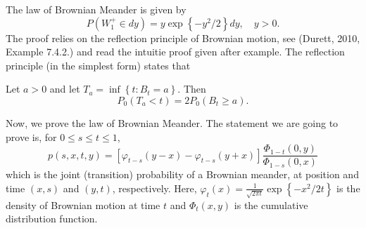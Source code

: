 \begin{tcolorbox}[breakable,title=Law of Brownian Meander,colback=yellow!10,colframe=black,]
    The law of Brownian Meander is given by
    \[
    P\left(W_1^{+} \in d y\right)=y \exp \left\{-y^2 / 2\right\} d y, \quad y>0.
    \]
    The proof relies on the reflection principle of Brownian motion, see (Durett, 2010, Example 7.4.2.) and read the intuitie proof given after example. The reflection principle (in the simplest form) states that
    \begin{tcolorbox}[title=,colback=gray!10,colframe=black]
        Let $a>0$ and let $T_a=\inf \left\{t: B_t=a\right\}$. Then
        \[
            P_0\left(T_a<t\right)=2 P_0\left(B_t \geq a\right).
            \]
    \end{tcolorbox}

    Now, we prove the law of Brownian Meander. The statement we are going to prove is, for $0 \le s \le t \le 1$, 
    \[
    p(s, x, t, y)=\left[\varphi_{t-s}(y-x)-\varphi_{t-s}(y+x)\right] \frac{\Phi_{1-t}(0, y)}{\Phi_{1-s}(0, x)}
    \]
    which is the joint (transition) probability of a Brownian meander, at position and time $(x,s)$ and $(y,t)$, respectively. Here, $\varphi_t(x)=\frac{1}{\sqrt{2 \pi t}} \exp \left\{-x^2 / 2t\right\}$ is the density of Brownian motion at time $t$ and $\Phi_t(x,y)$ is the cumulative distribution function.




\end{tcolorbox}
